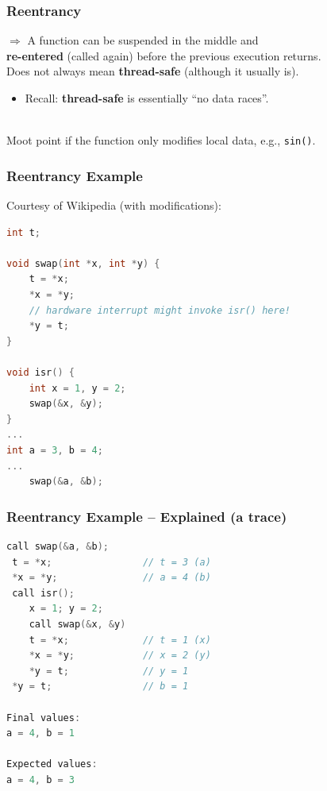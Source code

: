 \begin{frame}
  \frametitle{Reentrancy}

  
    $\Rightarrow$ A function can be suspended in the middle and \\ {\bf re-entered}
      (called again) before the previous execution returns.\\[1em]
    
     Does not always mean {\bf thread-safe} (although it usually is).
      \begin{itemize}
        \item Recall: {\bf thread-safe} is essentially ``no data races''.
      \end{itemize}
 ~\\[1em]
  Moot point if the function only modifies local data, e.g., {\tt sin()}.
  
\end{frame}

\begin{frame}[fragile]
  \frametitle{Reentrancy Example}

  

  Courtesy of Wikipedia (with modifications):
  \begin{lstlisting}[language=C]
int t;
 
void swap(int *x, int *y) {
    t = *x;
    *x = *y;
    // hardware interrupt might invoke isr() here!
    *y = t;
}
 
void isr() {
    int x = 1, y = 2;
    swap(&x, &y);
}
...
int a = 3, b = 4;
...
    swap(&a, &b);
  \end{lstlisting}
  
\end{frame}

\begin{frame}[fragile]
  \frametitle{Reentrancy Example -- Explained (a trace)}

  
  \begin{lstlisting}[language=C]
call swap(&a, &b);
 t = *x;                // t = 3 (a)
 *x = *y;               // a = 4 (b)
 call isr();
    x = 1; y = 2;
    call swap(&x, &y)
    t = *x;             // t = 1 (x)
    *x = *y;            // x = 2 (y)
    *y = t;             // y = 1
 *y = t;                // b = 1

Final values:
a = 4, b = 1

Expected values:
a = 4, b = 3
  \end{lstlisting}
  
\end{frame}

